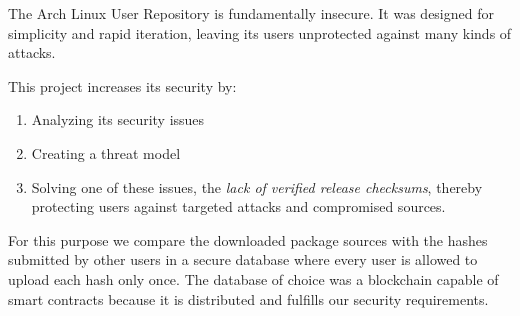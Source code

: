 The Arch Linux User Repository is fundamentally insecure.
It was designed for simplicity and rapid iteration, leaving its users unprotected against many kinds of attacks.

This project increases its security by:
\begin{enumerate}
	\item Analyzing its security issues
	\item Creating a threat model
	\item Solving one of these issues, the \emph{lack of verified release checksums}, thereby protecting users against targeted attacks and compromised sources.
\end{enumerate}

For this purpose we compare the downloaded package sources with the hashes submitted by other users in a secure database where every user is allowed to upload each hash only once.
The database of choice was a blockchain capable of smart contracts because it is distributed and fulfills our security requirements.
